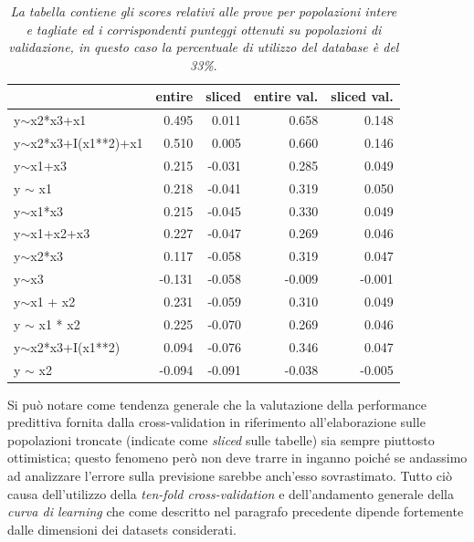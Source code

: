 \documentclass[a4paper]{report}
\begin{document}
\begin{table}[h!btp]
\begin{tabular}{lrrrr}
\toprule
{} &  entire &  sliced &  entire val. &  sliced val. \\
\midrule
y$\sim$x2*x3+x1          &         0.495 &         0.011 &             0.658 &             0.148 \\
y$\sim$x2*x3+I(x1**2)+x1 &         0.510 &         0.005 &             0.660 &             0.146 \\
y$\sim$x1+x3             &         0.215 &        -0.031 &             0.285 &             0.049 \\
y $\sim$ x1              &         0.218 &        -0.041 &             0.319 &             0.050 \\
y$\sim$x1*x3             &         0.215 &        -0.045 &             0.330 &             0.049 \\
y$\sim$x1+x2+x3          &         0.227 &        -0.047 &             0.269 &             0.046 \\
y$\sim$x2*x3             &         0.117 &        -0.058 &             0.319 &             0.047 \\
y$\sim$x3                &        -0.131 &        -0.058 &            -0.009 &            -0.001 \\
y$\sim$x1 + x2           &         0.231 &        -0.059 &             0.310 &             0.049 \\
y $\sim$ x1 * x2         &         0.225 &        -0.070 &             0.269 &             0.046 \\
y$\sim$x2*x3+I(x1**2)    &         0.094 &        -0.076 &             0.346 &             0.047 \\
y $\sim$ x2              &        -0.094 &        -0.091 &            -0.038 &            -0.005 \\
\bottomrule
\end{tabular}
\caption{\textit{La tabella contiene gli scores relativi alle prove per popolazioni intere e tagliate ed i corrispondenti punteggi  ottenuti su popolazioni di validazione, in questo caso la percentuale di utilizzo del database è del 33\%}.}
\end{table}
Si può notare come tendenza generale che la valutazione della performance predittiva fornita dalla cross-validation in riferimento all'elaborazione sulle popolazioni troncate (indicate come \textit{sliced} sulle tabelle) sia sempre piuttosto ottimistica; questo fenomeno però non deve trarre in inganno poiché se andassimo ad analizzare l'errore sulla previsione sarebbe anch'esso sovrastimato.  
Tutto ciò causa dell'utilizzo della \textit{ten-fold cross-validation} e dell'andamento generale della \textit{ curva di learning} che come descritto nel paragrafo precedente dipende fortemente dalle dimensioni dei datasets considerati. 
\end{document}
